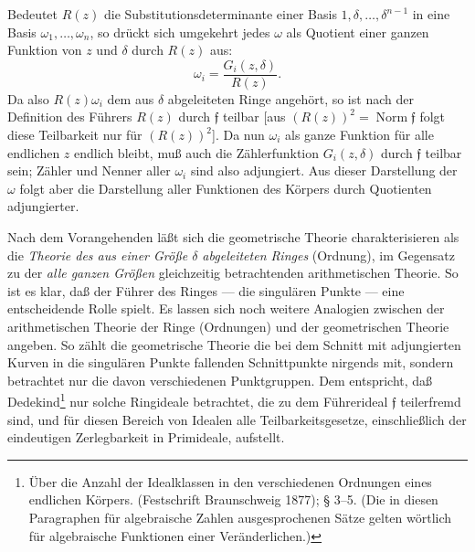 \documentclass[11pt]{article}
\providecommand{\frf}{\mathfrak f}
\begin{document}
Bedeutet \(R(z)\) die Substitutionsdeterminante einer Basis \(1,\delta,\ldots,\delta^{n-1}\) in eine Basis \(\omega_1,\ldots,\omega_n\), so drückt sich umgekehrt jedes \(\omega\) als Quotient einer ganzen Funktion von \(z\) und \(\delta\) durch \(R(z)\) aus:
\[
\omega_i=\frac{G_i(z,\delta)}{R(z)}.
\]
Da also \(R(z)\omega_i\) dem aus \(\delta\) abgeleiteten Ringe angehört, so ist nach der Definition des Führers \(R(z)\) durch \(\frf\) teilbar [aus \((R(z))^2=\operatorname{Norm}\frf\) folgt diese Teilbarkeit nur für \((R(z))^2\)]. Da nun \(\omega_i\) als ganze Funktion für alle endlichen \(z\) endlich bleibt, muß auch die Zählerfunktion \(G_i(z,\delta)\) durch \(\frf\) teilbar sein; Zähler und Nenner aller \(\omega_i\) sind also adjungiert. Aus dieser Darstellung der \(\omega\) folgt aber die Darstellung aller Funktionen des Körpers durch Quotienten adjungierter.

Nach dem Vorangehenden läßt sich die geometrische Theorie charakterisieren als die \emph{Theorie des aus einer Größe \(\delta\) abgeleiteten Ringes} (Ordnung), im Gegensatz zu der \emph{alle ganzen Größen} gleichzeitig betrachtenden arithmetischen Theorie. So ist es klar, daß der Führer des Ringes --- die singulären Punkte --- eine entscheidende Rolle spielt. Es lassen sich noch weitere Analogien zwischen der arithmetischen Theorie der Ringe (Ordnungen) und der geometrischen Theorie angeben. So zählt die geometrische Theorie die bei dem Schnitt mit adjungierten Kurven in die singulären Punkte fallenden Schnittpunkte nirgends mit, sondern betrachtet nur die davon verschiedenen Punktgruppen. Dem entspricht, daß Dedekind\footnote{Über die Anzahl der Idealklassen in den verschiedenen Ordnungen eines endlichen Körpers. (Festschrift Braunschweig 1877); § 3--5. (Die in diesen Paragraphen für algebraische Zahlen ausgesprochenen Sätze gelten wörtlich für algebraische Funktionen einer Veränderlichen.)} nur solche Ringideale betrachtet, die zu dem Führerideal \(\frf\) teilerfremd sind, und für diesen Bereich von Idealen alle Teilbarkeitsgesetze, einschließlich der eindeutigen Zerlegbarkeit in Primideale, aufstellt.
\end{document}
